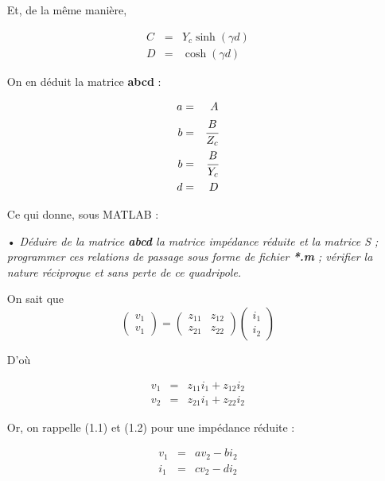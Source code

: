 \documentclass[11pt;a4paper;fleqn]{report}
\begin{document}
\begin{itemize}
     Et, de la même manière,

     \begin{eqnarray}
      C &=& Y_c \sinh(\gamma d) \\
      D &=& \cosh(\gamma d)
     \end{eqnarray}
      
     On en déduit la matrice \textbf{abcd} :
      
     \begin{eqnarray}
      a &=& A \\
      b &=& \cfrac{B}{Z_c} \\
      b &=& \cfrac{B}{Y_c} \\
      d &=& D
     \end{eqnarray}
      
     Ce qui donne, sous MATLAB :
     

    \newpage
    \item[•] \textit{Déduire de la matrice \textbf{abcd} la matrice impédance réduite et la matrice S ; programmer ces relations de passage sous forme de fichier \textbf{*.m} ; vérifier la nature réciproque et sans perte de ce quadripole.}

     On sait que 
     \[
      \begin{pmatrix}
       v_1 \\
       v_1  
      \end{pmatrix}
      =
      \begin{pmatrix}
       z_{11} & z_{12} \\
       z_{21} & z_{22}
      \end{pmatrix}
      \begin{pmatrix}
       i_1 \\
       i_2
      \end{pmatrix}
     \]

     D'où

     \begin{eqnarray}
      v_1 &=& z_{11} i_1 + z_{12} i_2 \\
      v_2 &=& z_{21} i_1 + z_{22} i_2
     \end{eqnarray}

     Or, on rappelle (1.1) et (1.2) pour une impédance réduite :

     \begin{eqnarray}
      v_1 &=& a v_2 - b i_2 \\
      i_1 &=& c v_2 - d i_2
     \end{eqnarray}


\end{itemize}
\end{document}
